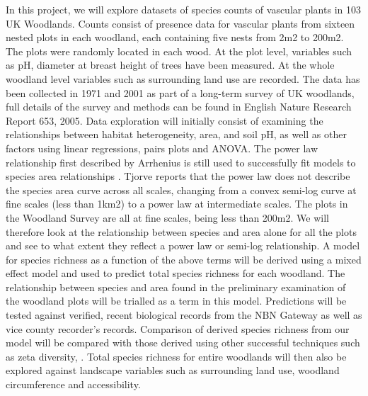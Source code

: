 \documentclass[a4paper]{article}
\begin{document}
In this project, we will explore datasets of species counts of vascular plants in 103 UK Woodlands. Counts consist of presence data for vascular plants from sixteen nested plots in each woodland, each containing five nests from 2m2 to 200m2.  The plots were randomly located in each wood. At the plot level, variables such as pH, diameter at breast height of trees have been measured. At the whole woodland level variables such as surrounding land use are recorded. The data has been collected in 1971 and 2001 as part of a long-term survey of UK woodlands, full details of the survey and methods can be found in English Nature Research Report 653, 2005.
Data exploration will initially consist of examining the relationships between habitat heterogeneity, area, and soil pH, as well as other factors using linear regressions, pairs plots and ANOVA. 
The power law relationship first described by Arrhenius is still used to successfully fit models to species area relationships \cite{principles}. Tjorve reports that the power law does not describe the species area curve across all scales, changing from a convex semi-log curve at fine scales (less than 1km2) to a power law at intermediate scales. The plots in the Woodland Survey are all at fine scales, being less than 200m2. We will therefore look at the relationship between species and area alone for all the plots and see to what extent they reflect a power law or semi-log relationship. 
A model for species richness as a function of the above terms will be derived using a mixed effect model and used to predict total species richness for each woodland.  The relationship between species and area found in the preliminary examination of the woodland plots will be trialled as a term in this model. Predictions will be tested against verified, recent biological records from the NBN Gateway as well as vice county recorder’s records. Comparison of derived species richness from our model will be compared with those derived using other successful techniques such as zeta diversity, \cite{hui2014zeta}. Total species richness for entire woodlands will then also be explored against landscape variables such as surrounding land use, woodland circumference and accessibility.



\end{document}
